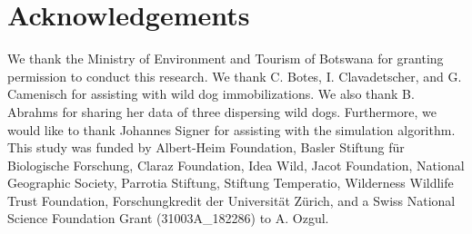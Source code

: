 \documentclass[abstract=on,10pt,a4paper,bibliography=totocnumbered]{article}
\begin{document}
\section{Acknowledgements}
We thank the Ministry of Environment and Tourism of Botswana for granting
permission to conduct this research. We thank C. Botes, I. Clavadetscher, and G.
Camenisch for assisting with wild dog immobilizations. We also thank B. Abrahms
for sharing her data of three dispersing wild dogs. Furthermore, we would like
to thank Johannes Signer for assisting with the simulation algorithm. This study
was funded by Albert-Heim Foundation, Basler Stiftung für Biologische Forschung,
Claraz Foundation, Idea Wild, Jacot Foundation, National Geographic Society,
Parrotia Stiftung, Stiftung Temperatio, Wilderness Wildlife Trust Foundation,
Forschungkredit der Universität Zürich, and a Swiss National Science Foundation
Grant (31003A\_182286) to A. Ozgul.

\newpage
\begingroup
\singlespacing

\endgroup
\end{document}
